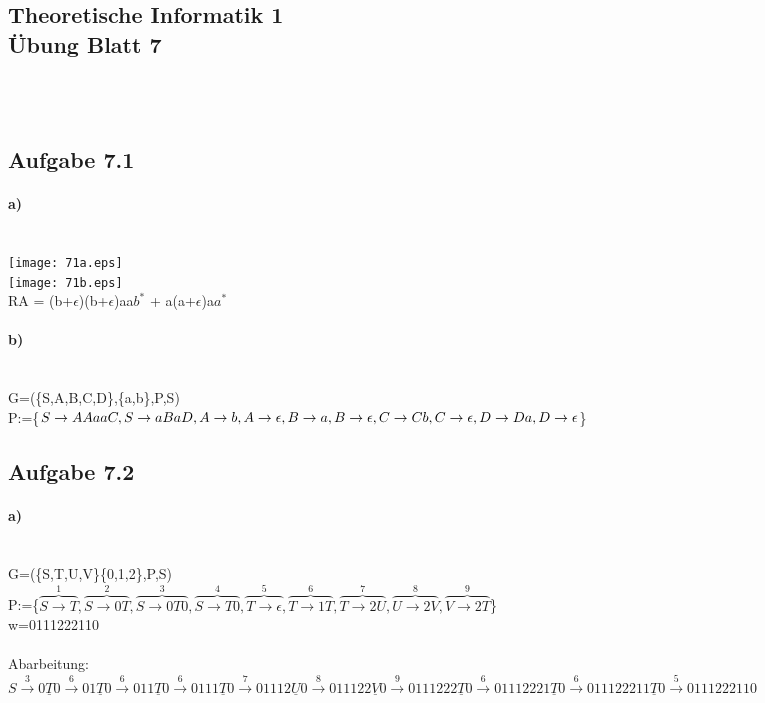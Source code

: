 \documentclass[11pt,a4paper]{article}
\begin{document}
\begin{center}
\section*{ Theoretische Informatik 1 \\ Übung Blatt 7}
\end{center}
\ \\ \ \\
\subsection*{Aufgabe 7.1}
\paragraph*{a)}\ \\
\texttt{[image: 71a.eps]}\\
\texttt{[image: 71b.eps]}\\
RA = (b+$\epsilon$)(b+$\epsilon$)aa$b^*$ + a(a+$\epsilon$)a$a^*$
\paragraph*{b)}\ \\
G=(\{S,A,B,C,D\},\{a,b\},P,S)\\
P:=\{$S \rightarrow AAaaC,S \rightarrow aBaD,A \rightarrow b,A \rightarrow \epsilon,B \rightarrow a, B \rightarrow \epsilon, C \rightarrow Cb,\\C \rightarrow \epsilon, D \rightarrow Da, D \rightarrow \epsilon$\}
\subsection*{Aufgabe 7.2}
\paragraph*{a)}\ \\
G=(\{S,T,U,V\}\{0,1,2\},P,S)\\
P:=\{$\overset{1}{\overbrace{S \rightarrow T}},\overset{2}{\overbrace{S \rightarrow 0T}},\overset{3}{\overbrace{S \rightarrow 0T0}},\overset{4}{\overbrace{S \rightarrow T0}},\overset{5}{\overbrace{T \rightarrow \epsilon}},\overset{6}{\overbrace{T \rightarrow 1T}},\overset{7}{\overbrace{T \rightarrow 2U}},\overset{8}{\overbrace{U \rightarrow 2V}},\overset{9}{\overbrace{V \rightarrow 2T}}$\}\\
w=0111222110\\
\ \\
Abarbeitung:\\
$S \overset{3}{\rightarrow} 0 \underline{T}0 \overset{6}{\rightarrow} 01 \underline{T}0 \overset{6}{\rightarrow} 011 \underline{T}0 \overset{6}{\rightarrow} 0111 \underline{T}0 \overset{7}{\rightarrow} 01112 \underline{U}0 \overset{8}{\rightarrow} 011122 \underline{V}0 \overset{9}{\rightarrow} 0111222 \underline{T}0 \overset{6}{\rightarrow} 01112221 \underline{T}0 \overset{6}{\rightarrow} 011122211 \underline{T}0 \overset{5}{\rightarrow} 0111222110$
\newpage
\end{document}
